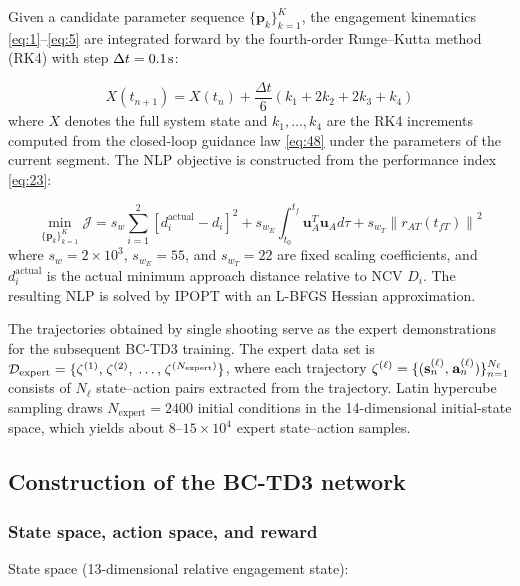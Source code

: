 Given a candidate parameter sequence $\{ {{\mathbf{p}}_k}\} _{k = 1}^K$, the engagement kinematics \eqref{eq:1}--\eqref{eq:5} are integrated forward by the fourth-order Runge--Kutta method (RK4) with step $\Delta t = 0.1{\kern 1pt} {\text{s}}$:

\begin{equation}
\label{eq:70}
X({t_{n + 1}}) = X({t_n}) + \frac{{\Delta t}}{6}({k_1} + 2{k_2} + 2{k_3} + {k_4})
\end{equation}
where $X$ denotes the full system state and ${k_1}, \ldots ,{k_4}$ are the RK4 increments computed from the closed-loop guidance law \eqref{eq:48} under the parameters of the current segment. The NLP objective is constructed from the performance index \eqref{eq:23}:

\begin{equation}
\label{eq:71}
\mathop {\min }\limits_{\{ {{\mathbf{p}}_k}\} _{k = 1}^K} \mathcal{J} = {s_w}\sum\limits_{i = 1}^2 {{{\left[ {d_i^{{\text{actual}}} - {d_i}} \right]}^2}}  + {s_{{w_E}}}\int_{{t_0}}^{{t_f}} {{\mathbf{u}}_A^T{{\mathbf{u}}_A}d\tau }  + {s_{{w_T}}}{\left\| {{r_{AT}}({t_{fT}})} \right\|^2}
\end{equation}
where ${s_w} = 2 \times {10^3}$, ${s_{{w_E}}} = 55$, and ${s_{{w_T}}} = 22$ are fixed scaling coefficients, and $d_i^{{\text{actual}}}$ is the actual minimum approach distance relative to NCV $D_i$. The resulting NLP is solved by IPOPT with an L-BFGS Hessian approximation.

The trajectories obtained by single shooting serve as the expert demonstrations for the subsequent BC-TD3 training. The expert data set is ${\mathcal{D}_{{\text{expert}}}} = \{ {\zeta ^{(1)}},{\kern 1pt} {\zeta ^{(2)}},{\kern 1pt}  \ldots ,{\kern 1pt} {\zeta ^{({N_{{\text{expert}}}})}}\} $, where each trajectory ${\zeta ^{(\ell )}} = \{ ({\mathbf{s}}_n^{(\ell )},{\kern 1pt} {\mathbf{a}}_n^{(\ell )})\} _{n = 1}^{{N_\ell }}$ consists of ${N_\ell}$ state--action pairs extracted from the trajectory. Latin hypercube sampling draws ${N_{{\text{expert}}}} = 2400$ initial conditions in the 14-dimensional initial-state space, which yields about $8$--$15 \times {10^4}$ expert state--action samples.

\subsection{Construction of the BC-TD3 network}
\subsubsection{State space, action space, and reward}
State space (13-dimensional relative engagement state):

